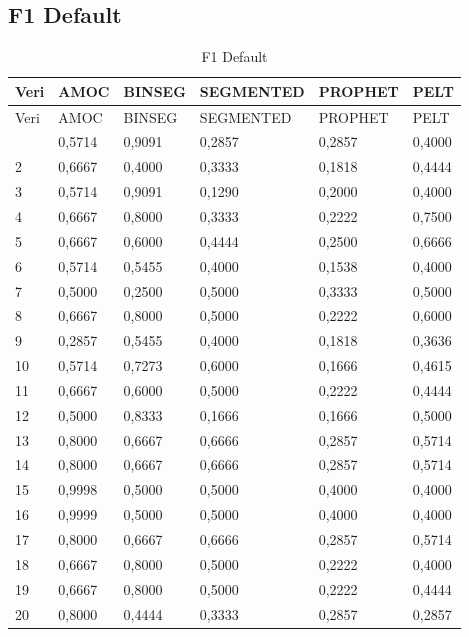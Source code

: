 \documentclass[12pt,twoside]{deuthesis}
\begin{document}
\hypertarget{f1-default-1}{%
\subsection{F1 Default}\label{f1-default-1}}

\begin{longtable}[]{@{}llllll@{}}
\caption{\label{tab:nvar7} F1 Default}\tabularnewline
\toprule\noalign{}
Veri & AMOC & BINSEG & SEGMENTED & PROPHET & PELT \\
\midrule\noalign{}
\endfirsthead
\toprule\noalign{}
Veri & AMOC & BINSEG & SEGMENTED & PROPHET & PELT \\
\midrule\noalign{}
\endhead
\bottomrule\noalign{}
\endlastfoot
1 & 0,5714 & 0,9091 & 0,2857 & 0,2857 & 0,4000 \\
2 & 0,6667 & 0,4000 & 0,3333 & 0,1818 & 0,4444 \\
3 & 0,5714 & 0,9091 & 0,1290 & 0,2000 & 0,4000 \\
4 & 0,6667 & 0,8000 & 0,3333 & 0,2222 & 0,7500 \\
5 & 0,6667 & 0,6000 & 0,4444 & 0,2500 & 0,6666 \\
6 & 0,5714 & 0,5455 & 0,4000 & 0,1538 & 0,4000 \\
7 & 0,5000 & 0,2500 & 0,5000 & 0,3333 & 0,5000 \\
8 & 0,6667 & 0,8000 & 0,5000 & 0,2222 & 0,6000 \\
9 & 0,2857 & 0,5455 & 0,4000 & 0,1818 & 0,3636 \\
10 & 0,5714 & 0,7273 & 0,6000 & 0,1666 & 0,4615 \\
11 & 0,6667 & 0,6000 & 0,5000 & 0,2222 & 0,4444 \\
12 & 0,5000 & 0,8333 & 0,1666 & 0,1666 & 0,5000 \\
13 & 0,8000 & 0,6667 & 0,6666 & 0,2857 & 0,5714 \\
14 & 0,8000 & 0,6667 & 0,6666 & 0,2857 & 0,5714 \\
15 & 0,9998 & 0,5000 & 0,5000 & 0,4000 & 0,4000 \\
16 & 0,9999 & 0,5000 & 0,5000 & 0,4000 & 0,4000 \\
17 & 0,8000 & 0,6667 & 0,6666 & 0,2857 & 0,5714 \\
18 & 0,6667 & 0,8000 & 0,5000 & 0,2222 & 0,4000 \\
19 & 0,6667 & 0,8000 & 0,5000 & 0,2222 & 0,4444 \\
20 & 0,8000 & 0,4444 & 0,3333 & 0,2857 & 0,2857 \\
\end{longtable}
\end{document}
